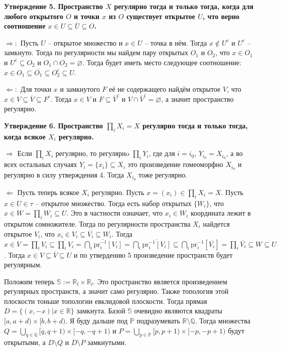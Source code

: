 \documentclass{article}
\begin{document}
\begin{enumerate}
        \textbf{Утверждение 5. Пространство $X$ регулярно тогда и только тогда,
        когда для любого открытого $O$ и точки $x$ из $O$ существует открытое
        $U$, что верно соотношение $x\in U\subseteq\overline{U}\subseteq O$.}

        $\Rightarrow:$ Пусть $U$ – открытое множество и $x\in U$ – точка в нём.
        Тогда $x\notin U^c$ и $U^c$ – замкнуто. Тогда по регулярности мы найдем
        пару открытых $O_1$ и $O_2$, что $x\in O_1$ и $U^c\subseteq O_2$ и
        $O_1\cap O_2=\varnothing$. Тогда будет иметь место следующее соотношение:
        $x\in O_1\subseteq\overline{O_1}\subseteq O_2^c\subseteq U$.

        $\Leftarrow:$ Для точки $x$ и замкнутого $F$ её не содержащего найдём
        открытое $V$, что $x\in V\subseteq\overline{V}\subseteq F^c$. Тогда
        $x\in V$ и $F\subseteq\overline{V}^c$ и $V\cap\overline{V}^c=\varnothing$,
        а значит пространство регулярно.

        \textbf{Утверждение 6. Пространство $\prod_iX_i=X$ регулярно тогда и
        только тогда, когда всякое $X_i$ регулярно.}

        $\Rightarrow$ Если $\prod_i X_i$ регулярно, то регулярнo $\prod_i Y_i$,
        где для $i=i_0$, $Y_{i_0}=X_{i_0}$, а во всех остальных случаях $Y_i=\{
            x_i\}\subseteq X_i$ это произведение гомеоморфно $X_{i_0}$ и регулярно в
        силу утверждения 4. Тогда $X_{i_0}$ тоже регулярно.

        $\Leftarrow$ Пусть теперь всякое $X_i$ регулярно. Пусть $x=(x_i)\in
        \prod_iX_i=X$. Пусть $x\in U\in\tau$ – открытое множество. Тогда есть
        набор открытых $\{W_i\}$, что $x\in W=\prod_iW_i\subseteq U$. Это в частности
        означает, что $x_i\in W_i$ координата лежит в открытом сомножителе.
        Тогда по регулярности пространства $X_i$ найдется открытое $V_i$, что
        $x_i\in V_i\subseteq\overline{V_i}\subseteq W_i$. Тогда $x\in V=\prod_i
        V_i\subseteq\overline{\prod_i V_i}=\overline{\bigcap_i\text{pr}_i^{-1}
        [V_i]}=\bigcap_i\overline{\text{pr}_i^{-1}[V_i]}\subseteq
        \bigcap_i\text{pr}_i^{-1}[\overline{V_i}]=\prod_i\overline{V_i}\subseteq
        W\subseteq U $. Тогда $x\in V\subseteq\overline{V}\subseteq{U}$ и по
        утвердению 5 произведение пространств будет регулярным.

        Положим теперь $\mathbb{S}:=\mathbb{R}_l\times \mathbb{R}_l$. Это
        пространство является произведением регулярных пространств, а значит
        само регулярно. Также топология этой плоскости тоньше топологии
        евклидовой плоскости. Тогда прямая $D=\{(x,-x)|x\in\mathbb{R}\}$
        замкнута. Базой $\mathbb{S}$ очевидно являются квадраты $[a,a+d)\times
        [b,b+d)$. Я буду дальше под $\mathbb{P}$ подразумевать $\mathbb{R}\setminus
        \mathbb{Q}$. Тогда множества $Q=\bigcup_{q\in\mathbb{Q}}[q,q+1)\times
        [-q,-q+1)$ и $P=\bigcup_{p\in\mathbb{P}}[p,p+1)\times[-p,-p+1)$ будут
        открытыми, а $D\setminus Q$ и $D\setminus P$ замкнутыми.


\end{enumerate}
\end{document}
